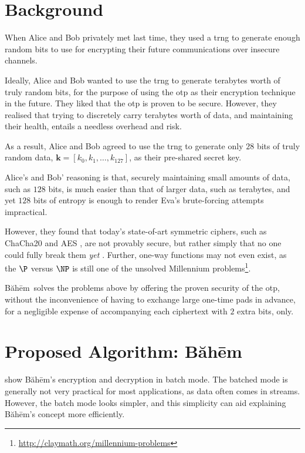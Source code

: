 \documentclass[twocolumn,hidelinks]{article}
\newcommand{\baheem}{Băhēm}
\begin{document}
\tableofcontents
\vfill

\section{Background}
When Alice and Bob privately met last time, they used a \gls{trng} to generate
enough random bits to use for encrypting their future communications over
insecure channels.

Ideally, Alice and Bob wanted to use the \gls{trng} to generate terabytes
worth of truly random bits, for the purpose of using the \gls{otp} as their
encryption technique in the future.  They liked that the \gls{otp} is
proven to be secure.  However, they realised that trying to discretely
carry terabytes worth of data, and maintaining their health, entails a
needless overhead and risk.

As a result, Alice and Bob agreed to use the \gls{trng} to generate only
$28$ bits of truly random data, $\mathbf{k} = [k_0, k_1, \ldots, k_{127}]$,
as their pre-shared secret key.

Alice's and Bob' reasoning is that, securely maintaining small amounts of
data, such as $128$ bits, is much easier than that of larger data, such as
terabytes, and yet $128$ bits of entropy is enough to render Eva's
brute-forcing attempts impractical.

However, they found that today's state-of-art symmetric ciphers, such as
ChaCha20 \cite{chacha20} and AES \cite{aes}, are not provably secure, but
rather simply that no one could fully break them \emph{yet}
\cite{cryptoeprint:2007:472}. Further, one-way functions may not even
exist, as the $\P$ versus $\NP$ is still one of the unsolved Millennium
problems\footnote{\url{http://claymath.org/millennium-problems}}.

\baheem\ solves the problems above by offering the proven security of the
\gls{otp}, without the inconvenience of having to exchange large one-time
pads in advance, for a negligible expense of accompanying each ciphertext
with $2$ extra bits, only.

\section{Proposed Algorithm:  \baheem}
 show \baheem's encryption and
decryption in batch mode.  The batched mode is generally not very practical
for most applications, as data often comes in streams. However, the batch
mode looks simpler, and this simplicity can aid explaining \baheem's
concept more efficiently.
\end{document}

